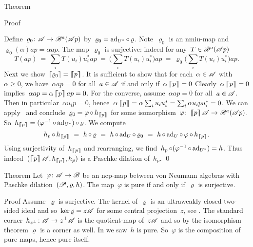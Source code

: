 \documentclass[b]{subfiles}
\begin{document}
\begin{parsec}
\begin{point}{Theorem}
\begin{point}{Proof}
\begin{point}
Define~$\varrho_0 \colon \mathscr{A} \to \mathscr{B}^a(\mathscr{A} p)$
    by~$\varrho_0 = \mathrm{ad}_{U^*} \mathop{\circ} \varrho$.
Note~$\varrho_0$ is an nmiu-map and~$\varrho_0(\alpha)ap = \alpha ap$.
The map~$\varrho_0$ is surjective:
    indeed for any~$T \in \mathscr{B}^a(\mathscr{A} p)$
\begin{equation*}
    T (ap) \ = \ \sum_i T( u_i ) u_i^* ap
           \ = \ \bigl(\sum_i T( u_i ) u_i^*\bigr) ap
           \ = \ \varrho_0 \bigl(\sum_i T( u_i ) u_i^*\bigr) ap.
\end{equation*}
Next we show~$\left\lceil\varrho_0\right\rceil = \left\lceil\!\!\left\lceil p\right\rceil\!\!\right\rceil$.
It is sufficient to show that for each~$\alpha \in \mathscr{A}$ with $\alpha \geq 0$,
    we have~$\alpha ap = 0$ for all~$a\in \mathscr{A}$ if and only if~$\alpha \left\lceil\!\!\left\lceil p\right\rceil\!\!\right\rceil = 0$
    Clearly~$\alpha \left\lceil\!\!\left\lceil p\right\rceil\!\!\right\rceil = 0$ implies~$\alpha ap = \alpha \left\lceil\!\!\left\lceil p\right\rceil\!\!\right\rceil ap= 0$.
For the converse, assume~$\alpha ap = 0$ for all~$a\in\mathscr{A}$.
Then in particular~$\alpha u_ip = 0$,
    hence~$\alpha \left\lceil\!\!\left\lceil p\right\rceil\!\!\right\rceil = \alpha \sum_i u_iu_i^*  = \sum_i \alpha u_ipu_i^*=0$.
We can apply~\TODO{}
    and conclude~$\varrho_0 = \varphi \mathop{\circ} h_{\left\lceil\!\!\left\lceil p\right\rceil\!\!\right\rceil}$
    for some isomorphism~$\varphi\colon
    \left\lceil\!\!\left\lceil p\right\rceil\!\!\right\rceil \mathscr{A} \to \mathscr{B}^a(\mathscr{A} p)$.
So~$h_{\left\lceil\!\!\left\lceil p\right\rceil\!\!\right\rceil} = (\varphi^{-1} \mathop{\circ} \mathrm{ad}_{U^*}) \mathop{\circ} \varrho$.
We compute
\begin{equation*}
h_p \after h_{\cceil{p}}
    \ =\  h \after \varrho
    \ =\ h \after \ad_U \after \varrho_0
    \ = \ h \after \ad_U \after \varphi \after h_{\cceil{p}}.
\end{equation*}
Using surjectivity of~$h_{\left\lceil\!\!\left\lceil p\right\rceil\!\!\right\rceil}$
and rearranging, we find~$h_p \mathop{\circ} (\varphi^{-1} \mathop{\circ} \mathrm{ad}_{U^*}) = h$.
Thus indeed~$(\cceil{p} \scrA, h_{\cceil{p}}, h_p)$
is a Paschke dilation of~$h_p$.  \qed
\end{point}
\end{point}
\end{point}
\begin{point}{Theorem}%
    Let~$\varphi\colon \mathscr{A} \to \mathscr{B}$ be an ncp-map
    between von Neumann algebras with
    Paschke dilation~$(\mathscr{P}, \varrho, h)$.
The map~$\varphi$ is pure if and only if~$\varrho$ is surjective.
\begin{point}{Proof}%
Assume~$\varrho$ is surjective.
The kernel of~$\varrho$ is an ultraweakly closed
two-sided ideal and so~$\ker\varrho = z \mathscr{A}$ for some central projection~$z$,
see .
The standard corner~$h_{z^\perp} \colon \mathscr{A} \to z^\perp \mathscr{A}$
    is the quotient-map of~$z \mathscr{A}$
    and so by the isomorphism theorem $\varrho$ is a corner as well.
In  we saw~$h$ is pure.
So~$\varphi$ is the composition of pure maps, hence pure itself.


\end{point}
\end{point}
\end{parsec}
\end{document}
